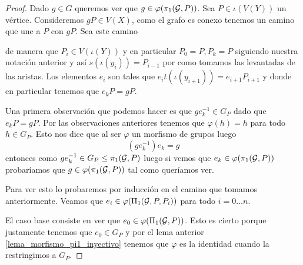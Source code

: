 \documentclass[tesis.tex]{subfiles}
\begin{document}
\begin{proof}
	Dado $g \in G$ queremos ver que $g \in \varphi(\pi_1({\cal G}, P))$.
	Sea $P \in \iota(V(Y))$ un vértice.
	Consideremos $gP \in V(X)$, como el grafo es conexo tenemos un camino que une a $P$ con $gP$. 
	Sea este camino 
	
	\begin{center}
	\end{center}
	


	de manera que $P_i \in V(\iota (Y))$ y en particular $P_0 = P, P_k = P$ siguiendo nuestra notación anterior y así $s(\iota (y_i)) = P_{i-1}$ por como tomamos las levantadas de las aristas.
	Los elementos $e_i$ son tales que $e_i t(\iota (y_{i+1})) = e_{i+1}P_{i+1}$ y donde en particular tenemos que $e_k P = g P$.
	
	
	
	Una primera observación que podemos hacer es que $g e_k^{-1} \in G_P$ dado que  $e_k P = g P$.
	Por las observaciones anteriores tenemos que $\varphi(h) = h $ para todo $h \in G_P$.
	Esto nos dice que al ser $\varphi$ un morfismo de grupos luego 
	\[
	(ge_k^{-1}) e_k = g
	\]
	entonces como $ge_k^{-1} \in G_P \le \pi_1({\cal G}, P)$ luego si vemos que $e_k \in \varphi(\pi_1({\cal G}, P))$ probaríamos que $g \in \varphi (\pi_1({\cal G},P))$ tal como queríamos ver.
		
	Para ver esto lo probaremos por inducción en el camino que tomamos anteriormente.
	Veamos que $e_i \in \varphi(\Pi_1({\cal G}, P, P_i))$ para todo $i = 0 \dots n$.
	
	El caso base consiste en ver que $e_0 \in \varphi(\Pi_1({\cal G}, P))$.
	Esto es cierto porque justamente tenemos que $e_0 \in G_P$ y por el lema anterior \ref{lema_morfismo_pi1_inyectivo} tenemos que $\varphi$ es la identidad cuando la restringimos a $G_P$.
	

\end{proof}
\end{document}
